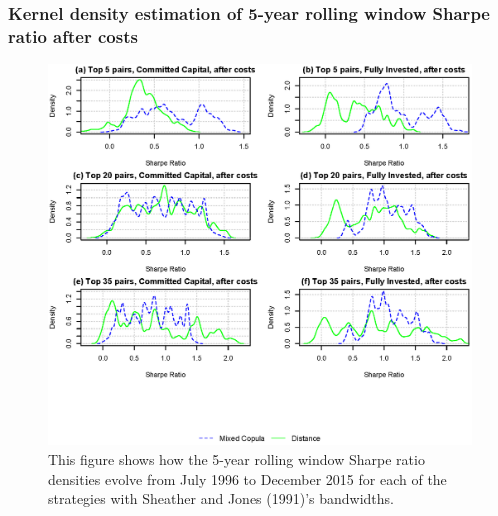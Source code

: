 \documentclass[pdf,9pt,xcolor=dvipsnames,hide notes]{beamer}
\begin{document}
\begin{frame}[label=frame5c]
\frametitle{Kernel density estimation of 5-year rolling window Sharpe ratio after costs}

\begin{figure}[!ht]
	\centering
	\includegraphics[scale=0.52]{Figure5.eps}
	\captionsetup{justification=raggedright,
		singlelinecheck=false
	}
	\caption*{\tiny  This figure shows how the 5-year rolling window Sharpe ratio densities evolve from July 1996 to December 2015 for each of the strategies with Sheather and Jones (1991)'s bandwidths.}
	\label{fig:fig5}
\end{figure}

\end{frame}
\end{document}
